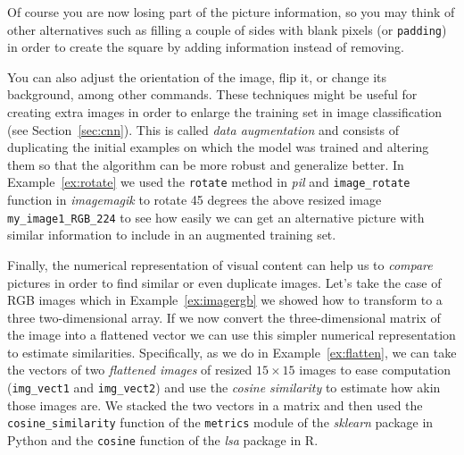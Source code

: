Of course you are now losing part of the picture information, so you may think of other alternatives such as filling a couple of sides with blank pixels (or \texttt{padding}) in order to create the square by adding information instead of removing.


You can also adjust the orientation of the image, flip it, or change its background, among other commands. These techniques might be useful for creating extra images in order to enlarge the training set in image classification (see Section~\ref{sec:cnn}). This is called \textit{data augmentation} and consists of duplicating the initial examples on which the model was trained and altering them so that the algorithm can be more robust and generalize better. In Example~\ref{ex:rotate} we used the \texttt{rotate} method in \emph{pil} and \texttt{image\_rotate} function in \emph{imagemagik} to rotate 45 degrees the above resized image \texttt{my\_image1\_RGB\_224} to see how easily we can get an alternative picture with similar information to include in an augmented training set.


Finally, the numerical representation of visual content can help us to \textit{compare} pictures in order to find similar or even duplicate images. Let's take the case of RGB images which in Example~\ref{ex:imagergb} we showed how to transform to a three two-dimensional array. If we now convert the three-dimensional matrix of the image into a flattened vector we can use this simpler numerical representation to estimate similarities. Specifically, as we do in Example~\ref{ex:flatten}, we can take the vectors of two \textit{flattened images} of resized $15 \times 15$ images to ease computation (\texttt{img\_vect1} and \texttt{img\_vect2}) and use the \textit{cosine similarity} to estimate how akin those images are. We stacked the two vectors in a matrix and then used the \texttt{cosine\_similarity} function of the \texttt{metrics} module of the  \emph{sklearn} package in Python and the \texttt{cosine} function of the \emph{lsa} package in R.


